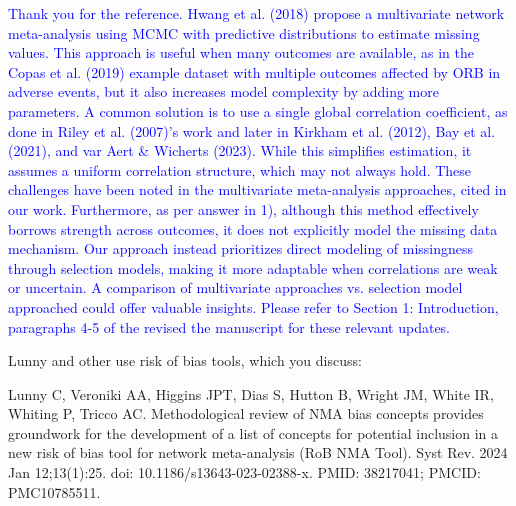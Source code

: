 \documentclass{article}
\begin{document}
\textcolor{blue}{Thank you for the reference. Hwang et al. (2018) propose a multivariate network meta-analysis using MCMC with predictive distributions to estimate missing values. This approach is useful when many outcomes are available, as in the Copas et al. (2019) example dataset with multiple outcomes affected by ORB in adverse events, but it also increases model complexity by adding more parameters. A common solution is to use a single global correlation coefficient, as done in Riley et al. (2007)'s work and later in Kirkham et al. (2012), Bay et al. (2021), and var Aert \& Wicherts (2023). While this simplifies estimation, it assumes a uniform correlation structure, which may not always hold. These challenges have been noted in the multivariate meta-analysis approaches, cited in our work. Furthermore, as per answer in 1), although this method effectively borrows strength across outcomes, it does not explicitly model the missing data mechanism. Our approach instead prioritizes direct modeling of missingness through selection models, making it more adaptable when correlations are weak or uncertain. A comparison of multivariate approaches vs. selection model approached could offer valuable insights. Please refer to Section 1: Introduction, paragraphs 4-5 of the revised the manuscript for these relevant updates.}

\bigskip

Lunny and other use risk of bias tools, which you discuss:

\bigskip

Lunny C, Veroniki AA, Higgins JPT, Dias S, Hutton B, Wright JM, White IR, Whiting P, Tricco AC. Methodological review of NMA bias concepts provides groundwork for the development of a list of concepts for potential inclusion in a new risk of bias tool for network meta-analysis (RoB NMA Tool). Syst Rev. 2024 Jan 12;13(1):25. doi: 10.1186/s13643-023-02388-x. PMID: 38217041; PMCID: PMC10785511. 

\bigskip
\end{document}
